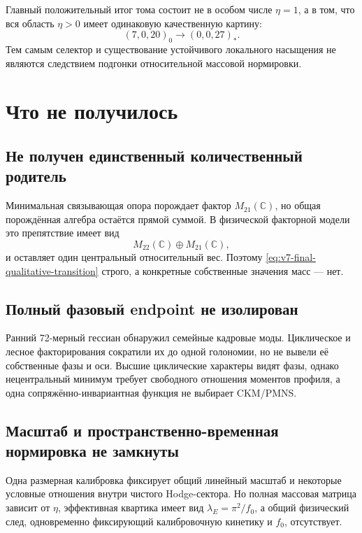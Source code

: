 Главный положительный итог тома состоит не в особом числе $\eta=1$, а в
том, что вся область $\eta>0$ имеет одинаковую качественную картину:
\begin{equation}
 (7,0,20)_0\longrightarrow(0,0,27)_*.
 \label{eq:v7-final-qualitative-transition}
\end{equation}
Тем самым селектор и существование устойчивого локального насыщения не
являются следствием подгонки относительной массовой нормировки.

\section{Что не получилось}

\subsection{Не получен единственный количественный родитель}

Минимальная связывающая опора порождает фактор $M_{21}(\mathbb C)$, но
общая порождённая алгебра остаётся прямой суммой. В физической факторной
модели это препятствие имеет вид
\begin{equation}
 M_{22}(\mathbb C)\oplus M_{21}(\mathbb C),
\end{equation}
и оставляет один центральный относительный вес. Поэтому
\eqref{eq:v7-final-qualitative-transition} строго, а конкретные
собственные значения масс --- нет.

\subsection{Полный фазовый endpoint не изолирован}

Ранний 72-мерный гессиан обнаружил семейные кадровые моды. Циклическое и
лесное факторирования сократили их до одной голономии, но не вывели её
собственные фазы и оси. Высшие циклические характеры видят фазы, однако
нецентральный минимум требует свободного отношения моментов профиля, а
одна сопряжённо-инвариантная функция не выбирает CKM/PMNS.

\subsection{Масштаб и пространственно-временная нормировка не замкнуты}

Одна размерная калибровка фиксирует общий линейный масштаб и некоторые
условные отношения внутри чистого Hodge-сектора. Но полная массовая
матрица зависит от $\eta$, эффективная квартика имеет вид
$\lambda_E=\pi^2/f_0$, а общий физический след, одновременно фиксирующий
калибровочную кинетику и $f_0$, отсутствует.

